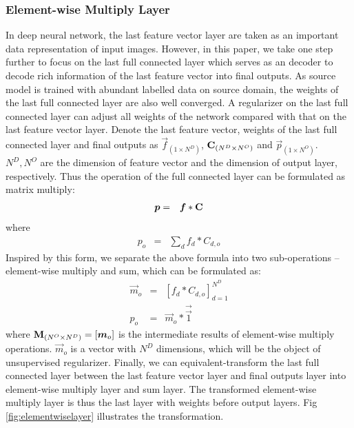 \documentclass[runningheads]{llncs}
\begin{document}
\subsubsection{Element-wise Multiply Layer}
\label{section:Element-wise Multiply Layer}
In deep neural network, the last feature vector layer are taken as an important data representation of input images. However, in this paper, we take one step further to focus on the last full connected layer which serves as an decoder to decode rich information of the last feature vector into final outputs. As source model is trained with abundant labelled data on source domain, the weights of the last full connected layer are also well converged. A regularizer on the last full connected layer can adjust all weights of the network compared with that on the last feature vector layer. Denote the last feature vector, weights of the last full connected layer and final outputs as $\vec{f}_{(1\times N^{D})}$, ${\bf C}_{(N^{D}\times N^{O})}$ and $\vec{p}_{(1\times N^{O})}$. $ N^{D}, N^{O}$ are the dimension of feature vector and the dimension of output layer, respectively. Thus the operation of the full connected layer can be formulated as matrix multiply:
\begin{eqnarray}
  \vec{p} &=& \vec{f}*{\bf C} \label{eq:matrixmultiply}
\end{eqnarray}
where
\begin{eqnarray}
  p_{o} &=&  \sum_{d}{f_{d}*C_{d,o}}
\end{eqnarray}
Inspired by this form, we separate the above formula into two sub-operations -- element-wise multiply and sum, which can be formulated as:
\begin{eqnarray}
  \vec{m}_{o} &=& [f_{d} * C_{d,o}]^{N^{D}}_{d=1} \label{eq:elementwisemultiply} \\
  p_{o} &=& \vec{m}_{o}*\vec{\overrightarrow{1}}
\end{eqnarray}
where ${\bf M}_{(N^{O}\times N^{D})} = [\vec{m}_{o}]$ is the intermediate results of element-wise multiply operations. $\vec{m}_{o}$ is a vector with $N^{D}$ dimensions, which will be the object of unsupervised regularizer. Finally, we can equivalent-transform the last full connected layer between the last feature vector layer and final outputs layer into element-wise multiply layer and sum layer. The transformed element-wise multiply layer is thus the last layer with weights before output layers. Fig \ref{fig:elementwiselayer} illustrates the transformation.
\end{document}
